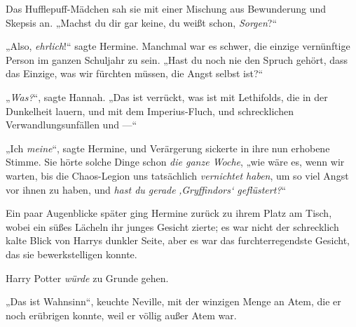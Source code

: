 Das Hufflepuff-Mädchen sah sie mit einer Mischung aus Bewunderung und Skepsis an.
„Machst du dir gar keine, du weißt schon, \emph{Sorgen}?“

„Also, \emph{ehrlich}!“ sagte Hermine. Manchmal war es schwer, die einzige vernünftige Person im ganzen Schuljahr zu sein.
„Hast du noch nie den Spruch gehört, dass das Einzige, was wir fürchten müssen, die Angst selbst ist?“

„\emph{Was?}“, sagte Hannah.
„Das ist verrückt, was ist mit Lethifolds, die in der Dunkelheit lauern, und mit dem Imperius-Fluch, und schrecklichen Verwandlungsunfällen und —“

„Ich \emph{meine}“, sagte Hermine, und Verärgerung sickerte in ihre nun erhobene Stimme. Sie hörte solche Dinge schon \emph{die ganze Woche}, „wie wäre es, wenn wir warten, bis die Chaos-Legion uns tatsächlich \emph{vernichtet haben}, um so viel Angst vor ihnen zu haben, und \emph{hast du gerade} \emph{‚Gryffindors‘ geflüstert?}“

Ein paar Augenblicke später ging Hermine zurück zu ihrem Platz am Tisch, wobei ein süßes Lächeln ihr junges Gesicht zierte; es war nicht der schrecklich kalte Blick von Harrys dunkler Seite, aber es war das furchterregendste Gesicht, das sie bewerkstelligen konnte.

Harry Potter \emph{würde} zu Grunde gehen.

\later

„Das ist Wahnsinn“, keuchte Neville, mit der winzigen Menge an Atem, die er noch erübrigen konnte, weil er völlig außer Atem war.

